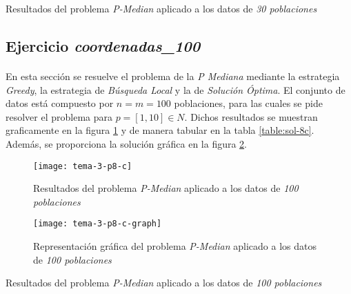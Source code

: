 \documentclass[spanish]{article}
\begin{document}
			\begin{table}[h]
				\begin{center}
				\end{center}
				\caption{Resultados del problema \emph{P-Median} aplicado a los datos de \emph{30 poblaciones}}
				\label{table:sol-8b}
			\end{table}

		\subsection{Ejercicio \emph{coordenadas\_100}}
		\label{sec:e-8c}

			\paragraph{}
			En esta sección se resuelve el problema de la \emph{P Mediana} mediante la estrategia \emph{Greedy}, la estrategia de \emph{Búsqueda Local} y la de \emph{Solución Óptima}. El conjunto de datos está compuesto por $n = m = 100$ poblaciones, para las cuales se pide resolver el problema para $p = [1,10] \in N$. Dichos resultados se muestran graficamente en la figura \ref{fig:sol-8c} y de manera tabular en la tabla \ref{table:sol-8c}. Además, se proporciona la solución gráfica en la figura \ref{fig:sol-8c-graph}.


			\begin{figure}[h]
				\begin{center}
					\texttt{[image: tema-3-p8-c]}
				\end{center}
				\caption{Resultados del problema \emph{P-Median} aplicado a los datos de \emph{100 poblaciones}}
				\label{fig:sol-8c}
			\end{figure}

			\begin{figure}[h]
				\begin{center}
					\texttt{[image: tema-3-p8-c-graph]}
				\end{center}
				\caption{Representación gráfica del problema \emph{P-Median} aplicado a los datos de \emph{100 poblaciones}}
				\label{fig:sol-8c-graph}
			\end{figure}

			\begin{table}[h]
				\begin{center}
				\end{center}
				\caption{Resultados del problema \emph{P-Median} aplicado a los datos de \emph{100 poblaciones}}
				\label{table:sol-8c}
			\end{table}

	\nocite{subject:mio}
	\nocite{garciparedes:mosel-examples}
	
  
\end{document}
